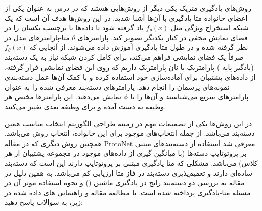 \documentclass{article}
\begin{document}
روش‌های یادگیری متریک یکی دیگر از روش‌هایی هستند که در درس به عنوان یکی از اعضای خانواده متا-یادگیری با آن‌ها آشنا شدید. در این روش‌ها هدف آن است که یک شبکه استخراج ویژگی مثل
$f_\theta(x)$
یاد گرفته شود تا داده‌ها با برچسب یکسان را در فضای نمایش مخفی در کنار یکدیگر تصویر کند. پارامترهای 
$\theta$
متا-پارامترهای مدل در نظر گرفته شده و در طول متا-یادگیری آموزش داده می‌شوند. از آنجایی که 
$f_\theta(x)$
صرفاً یک فضای نمایشی 
 فراهم می‌کند، برای کامل کردن شبکه نیاز به یک دسته‌بند (یادگیر پایه
) پارامتریک یا نان-پارامتریک داریم که روی این فضای نمایشی قرار گرفته، از داده‌های پشتیبان برای آماده‌سازی خود استفاده کرده و با کمک آن‌ها عمل دسته‌بندی نمونه‌های پرسمان را انجام دهد. پارامترهای دسته‌بند معرفی شده را به عنوان پارامترهای سریع می‌شناسند و آن‌ها را با 
$\phi$
نمایش می‌دهند. این پارامترها مختص هر وظیفه به دست آمده و برای وظیفه بعدی تغییر می‌کنند.

در این روش‌ها یکی از تصمیمات مهم در زمینه طراحی الگوریتم انتخاب مناسب همین دسته‌بند می‌باشد. از جمله انتخاب‌های موجود برای این خانواده، انتخاب روش  
می‌باشد. همچنین روش دیگری که در مقاله 
\href{https://arxiv.org/abs/1703.05175}{ProtoNet}
 معرفی شد استفاده از دسته‌بندهای مبتنی بر پروتوتایپ دسته‌ها (با میانگین گیری از داده‌های موجود در مجموعه پشتیبان از هر کلاس) می‌باشد. 
مشکلی که متا-یادگیری مبتنی بر پروتوتایپ دارند این است که دسته‌بند ساده‌ای دارند و تعمیم‌پذیری دسته‌بند در فاز متا-ارزیابی
 کم می‌باشد. به همین دلیل در مقاله
به بررسی دو دسته‌بند رایج در یادگیری ماشین () و نحوه استفاده موثر آن در مسئله متا-یادگیری پرداخته شده است. با مطالعه مقاله و راهنمایی های داده‌ شده در زیر،‌ به سوالات پاسخ دهید:
\end{document}
